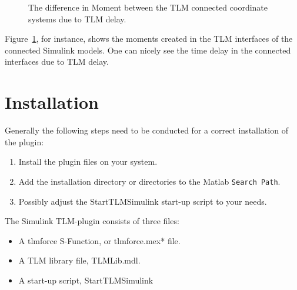 \begin{figure}[ht]
\centering
{}
\caption{The difference in Moment between the TLM connected coordinate
	systems due to TLM delay.}
\label{fig:MomentShafts}
\end{figure}

Figure~\ref{fig:MomentShafts}, for instance, shows the moments created in the TLM interfaces of the connected Simulink models. 
One can nicely see the time delay in the connected interfaces due to TLM delay.

\section{Installation}
Generally the following steps need to be conducted for a correct installation of the plugin:
\begin{enumerate}
\item Install the plugin files on your system.
\item Add the installation directory or directories to the Matlab {\tt Search Path}.
\item Possibly adjust the StartTLMSimulink start-up script to your needs.
\end{enumerate}

The Simulink TLM-plugin consists of three files:
\begin{itemize}
\item A tlmforce S-Function, or tlmforce.mex* file.
\item A TLM library file, TLMLib.mdl.
\item A start-up script, StartTLMSimulink
\end{itemize}

